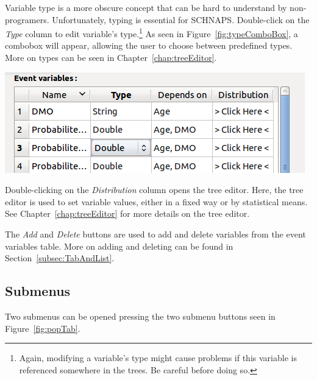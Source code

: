 \documentclass[a4paper,11pt]{report}
\begin{document}
Variable type is a more obscure concept that can be hard to understand by non-programers. Unfortunately, typing is essential for SCHNAPS. Double-click on the \emph{Type} column to edit variable's type.\footnote{Again, modifying a variable's type might cause problems if this variable is referenced somewhere in the trees. Be careful before doing so.} As seen in Figure~\ref{fig:typeComboBox}, a combobox will appear, allowing the user to choose between predefined types. More on types can be seen in Chapter~\ref{chap:treeEditor}.
\begin{center}
\includegraphics[scale=0.4]{Pictures/Population/typeComboBox.png}
\label{fig:typeComboBox}
\end{center}

Double-clicking on the \emph{Distribution} column opens the tree editor. Here, the tree editor is used to set variable values, either in a fixed way or by statistical means. See Chapter~\ref{chap:treeEditor} for more details on the tree editor.

The \emph{Add} and \emph{Delete} buttons are used to add and delete variables from the event variables table. More on adding and deleting can be found in Section~\ref{subsec:TabAndList}.

\subsection{Submenus}
Two submenus can be opened pressing the two submenu buttons seen in Figure~\ref{fig:popTab}.
\end{document}

